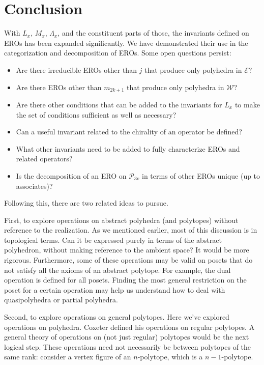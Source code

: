\documentclass{amsart}[12pt]
\begin{document}
\section{Conclusion}
With $L_x$, $M_x$, $\Lambda_x$, and the constituent parts of those,
the invariants defined on EROs has been expanded significantly. We have
demonstrated their use in the categorization and decomposition of EROs.
Some open questions persist:
\begin{itemize}
\item Are there irreducible EROs other than $j$ that produce only polyhedra in $\mathcal{E}$?
\item Are there EROs other than $m_{2k+1}$ that produce only polyhedra in  $\mathcal{W}$?
\item Are there other conditions that can be added to the invariants for $L_x$ to make the set of conditions sufficient as well as necessary?
\item Can a useful invariant related to the chirality of an operator be defined?
\item What other invariants need to be added to fully characterize EROs and related operators?
\item Is the decomposition of an ERO on $\mathcal{P}_{3v}$ in terms of
  other EROs unique (up to associates)?
\end{itemize}

Following this, there are two related ideas to pursue.

First, to explore operations on abstract polyhedra (and polytopes) without
reference to the realization. As we mentioned earlier, most of this discussion
is in topological terms. Can it be expressed purely in terms of the abstract
polyhedron, without making reference to the ambient space? It would be more
rigorous. Furthermore, some of these operations may be valid on posets that do
not satisfy all the axioms of an abstract polytope. For example, the dual
operation is defined for all posets. Finding the most general restriction on
the poset for a certain operation may help us understand how to deal with
quasipolyhedra or partial polyhedra.

Second, to explore operations on general polytopes. Here we've explored
operations on polyhedra. Coxeter defined his operations on regular polytopes.
A general theory of operations on (not just regular) polytopes would be the
next logical step. These operations need not necessarily be between polytopes
of the same rank: consider a vertex figure of an $n$-polytope, which is a
$n-1$-polytope.
\end{document}
